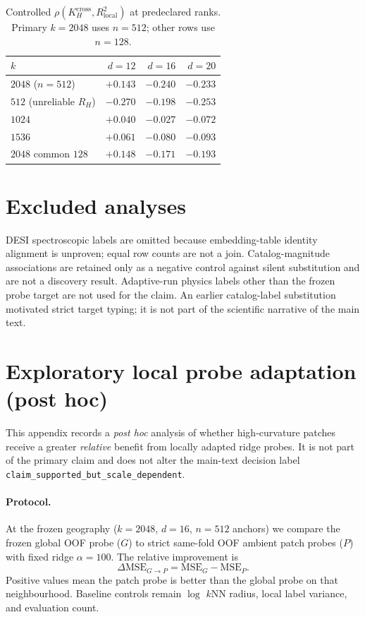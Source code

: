\begin{table}[h]
\caption{Controlled $\rho(K_H^{\mathrm{cross}},R^{2}_{\mathrm{local}})$ at predeclared ranks. Primary $k{=}2048$ uses $n{=}512$; other rows use $n{=}128$.}
\label{tab:scale}
\centering
\footnotesize
\begin{tabular}{lrrr}
\toprule
$k$ & $d{=}12$ & $d{=}16$ & $d{=}20$ \\
\midrule
$2048$ ($n{=}512$) & $+0.143$ & $-0.240$ & $-0.233$ \\
$512$ (unreliable $R_H$) & $-0.270$ & $-0.198$ & $-0.253$ \\
$1024$ & $+0.040$ & $-0.027$ & $-0.072$ \\
$1536$ & $+0.061$ & $-0.080$ & $-0.093$ \\
$2048$ common $128$ & $+0.148$ & $-0.171$ & $-0.193$ \\
\bottomrule
\end{tabular}
\end{table}

\section{Excluded analyses}
\label{app:excluded}

DESI spectroscopic labels are omitted because embedding-table identity alignment is unproven; equal row counts are not a join. Catalog-magnitude associations are retained only as a negative control against silent substitution and are not a discovery result. Adaptive-run physics labels other than the frozen probe target are not used for the claim. An earlier catalog-label substitution motivated strict target typing; it is not part of the scientific narrative of the main text.

\section{Exploratory local probe adaptation (post hoc)}
\label{app:lpa}

This appendix records a \emph{post hoc} analysis of whether high-curvature patches receive a greater \emph{relative} benefit from locally adapted ridge probes. It is not part of the primary claim and does not alter the main-text decision label \texttt{claim\_supported\_but\_scale\_dependent}.

\paragraph{Protocol.} At the frozen geography ($k{=}2048$, $d{=}16$, $n{=}512$ anchors) we compare the frozen global OOF probe ($G$) to strict same-fold OOF ambient patch probes ($P$) with fixed ridge $\alpha{=}100$. The relative improvement is
\[
\Delta\mathrm{MSE}_{G\to P}=\mathrm{MSE}_G-\mathrm{MSE}_P.
\]
Positive values mean the patch probe is better than the global probe on that neighbourhood. Baseline controls remain $\log$ $k$NN radius, local label variance, and evaluation count.

